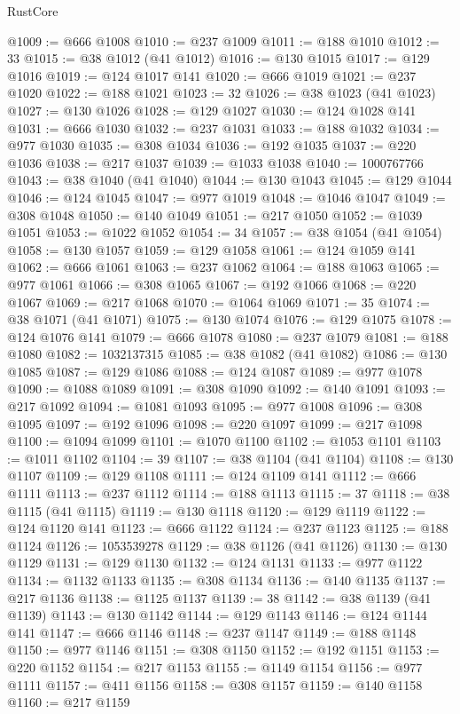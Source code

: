 \begin{lexlean}{RustCore}
\begin{coremodule}
@1009 := @666 @1008
@1010 := @237 @1009
@1011 := @188 @1010
@1012 := 33
@1015 := @38 @1012 (@41 @1012)
@1016 := @130 @1015
@1017 := @129 @1016
@1019 := @124 @1017 @141
@1020 := @666 @1019
@1021 := @237 @1020
@1022 := @188 @1021
@1023 := 32
@1026 := @38 @1023 (@41 @1023)
@1027 := @130 @1026
@1028 := @129 @1027
@1030 := @124 @1028 @141
@1031 := @666 @1030
@1032 := @237 @1031
@1033 := @188 @1032
@1034 := @977 @1030
@1035 := @308 @1034
@1036 := @192 @1035
@1037 := @220 @1036
@1038 := @217 @1037
@1039 := @1033 @1038
@1040 := 1000767766
@1043 := @38 @1040 (@41 @1040)
@1044 := @130 @1043
@1045 := @129 @1044
@1046 := @124 @1045
@1047 := @977 @1019
@1048 := @1046 @1047
@1049 := @308 @1048
@1050 := @140 @1049
@1051 := @217 @1050
@1052 := @1039 @1051
@1053 := @1022 @1052
@1054 := 34
@1057 := @38 @1054 (@41 @1054)
@1058 := @130 @1057
@1059 := @129 @1058
@1061 := @124 @1059 @141
@1062 := @666 @1061
@1063 := @237 @1062
@1064 := @188 @1063
@1065 := @977 @1061
@1066 := @308 @1065
@1067 := @192 @1066
@1068 := @220 @1067
@1069 := @217 @1068
@1070 := @1064 @1069
@1071 := 35
@1074 := @38 @1071 (@41 @1071)
@1075 := @130 @1074
@1076 := @129 @1075
@1078 := @124 @1076 @141
@1079 := @666 @1078
@1080 := @237 @1079
@1081 := @188 @1080
@1082 := 1032137315
@1085 := @38 @1082 (@41 @1082)
@1086 := @130 @1085
@1087 := @129 @1086
@1088 := @124 @1087
@1089 := @977 @1078
@1090 := @1088 @1089
@1091 := @308 @1090
@1092 := @140 @1091
@1093 := @217 @1092
@1094 := @1081 @1093
@1095 := @977 @1008
@1096 := @308 @1095
@1097 := @192 @1096
@1098 := @220 @1097
@1099 := @217 @1098
@1100 := @1094 @1099
@1101 := @1070 @1100
@1102 := @1053 @1101
@1103 := @1011 @1102
@1104 := 39
@1107 := @38 @1104 (@41 @1104)
@1108 := @130 @1107
@1109 := @129 @1108
@1111 := @124 @1109 @141
@1112 := @666 @1111
@1113 := @237 @1112
@1114 := @188 @1113
@1115 := 37
@1118 := @38 @1115 (@41 @1115)
@1119 := @130 @1118
@1120 := @129 @1119
@1122 := @124 @1120 @141
@1123 := @666 @1122
@1124 := @237 @1123
@1125 := @188 @1124
@1126 := 1053539278
@1129 := @38 @1126 (@41 @1126)
@1130 := @130 @1129
@1131 := @129 @1130
@1132 := @124 @1131
@1133 := @977 @1122
@1134 := @1132 @1133
@1135 := @308 @1134
@1136 := @140 @1135
@1137 := @217 @1136
@1138 := @1125 @1137
@1139 := 38
@1142 := @38 @1139 (@41 @1139)
@1143 := @130 @1142
@1144 := @129 @1143
@1146 := @124 @1144 @141
@1147 := @666 @1146
@1148 := @237 @1147
@1149 := @188 @1148
@1150 := @977 @1146
@1151 := @308 @1150
@1152 := @192 @1151
@1153 := @220 @1152
@1154 := @217 @1153
@1155 := @1149 @1154
@1156 := @977 @1111
@1157 := @411 @1156
@1158 := @308 @1157
@1159 := @140 @1158
@1160 := @217 @1159

\end{coremodule}
\end{lexlean}
